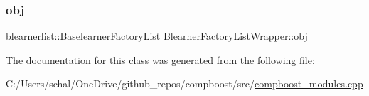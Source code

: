 \mbox{\label{class_blearner_factory_list_wrapper_a3c9f95887bc2c583c120d01efc2e69b2}} 
\subsubsection{\texorpdfstring{obj}{obj}}
{\footnotesize\ttfamily \mbox{\hyperlink{classblearnerlist_1_1_baselearner_factory_list}{blearnerlist\+::\+Baselearner\+Factory\+List}} Blearner\+Factory\+List\+Wrapper\+::obj\hspace{0.3cm}{\ttfamily [private]}}



The documentation for this class was generated from the following file\+:\begin{DoxyCompactItemize}
\item 
C\+:/\+Users/schal/\+One\+Drive/github\+\_\+repos/compboost/src/\mbox{\hyperlink{compboost__modules_8cpp}{compboost\+\_\+modules.\+cpp}}\end{DoxyCompactItemize}
